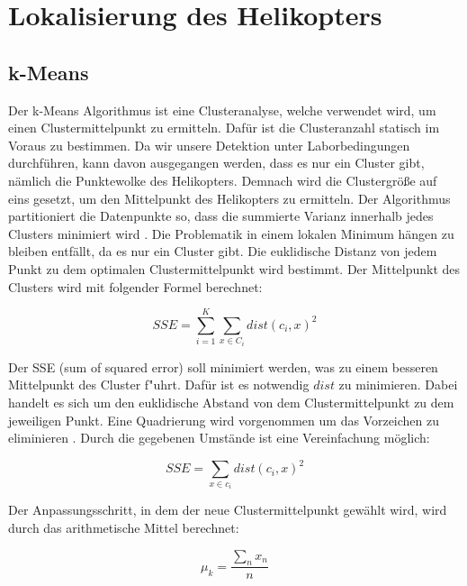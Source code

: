 \section{Lokalisierung des Helikopters} 
\label{sec:lokalisierung}

\subsection{k-Means}
\label{subsec:kmeans}

Der k-Means Algorithmus ist eine Clusteranalyse, welche verwendet wird, um einen Clustermittelpunkt zu ermitteln. Dafür ist die Clusteranzahl statisch im Voraus zu bestimmen. Da wir unsere Detektion unter Laborbedingungen durchführen, kann davon ausgegangen werden, dass es nur ein Cluster gibt, nämlich die Punktewolke des Helikopters. Demnach wird die Clustergröße auf eins gesetzt, um den Mittelpunkt des Helikopters zu ermitteln. {Der Algorithmus partitioniert die Datenpunkte so, dass die summierte Varianz innerhalb jedes Clusters minimiert wird} \cite{KM}.\newline
\noindent Die Problematik in einem lokalen Minimum hängen zu bleiben entfällt, da es nur ein Cluster gibt. Die euklidische Distanz von jedem Punkt zu dem optimalen Clustermittelpunkt wird bestimmt. Der Mittelpunkt des Clusters wird mit folgender Formel berechnet:

\begin{equation}
SSE=\sum_{i=1}^K \sum_{x \in C_i} dist(c_i, x)^{2}
\end{equation}

\noindent Der SSE (sum of squared error) soll minimiert werden, was zu einem besseren Mittelpunkt des Cluster f"uhrt. Dafür ist es notwendig $dist$ zu minimieren. Dabei
handelt es sich um den euklidische Abstand von dem Clustermittelpunkt zu dem jeweiligen Punkt. Eine Quadrierung wird vorgenommen um das Vorzeichen zu eliminieren \cite{TUM}. Durch die gegebenen Umstände ist eine Vereinfachung möglich:\newline

\begin{equation}
SSE=\sum_{x \in c_i} dist(c_i, x)^{2}
\end{equation}

\noindent Der Anpassungsschritt, in dem der neue Clustermittelpunkt gewählt wird, wird durch das arithmetische Mittel berechnet:

\begin{equation}
\mu_k = \dfrac{\sum_{n}x_{n}}{n}
\end{equation}

